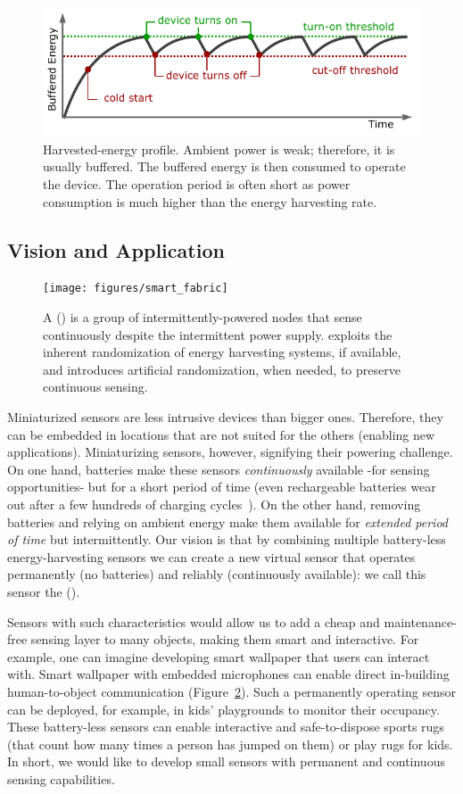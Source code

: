 \begin{figure}[b]
	\centering
		\includegraphics[width=\columnwidth]{figures/intermittent_operation}
		\caption{Harvested-energy profile. Ambient power is weak; therefore, it is usually buffered. The buffered energy is then consumed to operate the device. The operation period is often short as power consumption is much higher than the energy harvesting rate.}
		\label{fig:intermittent_opertaion}
\end{figure} 
%
\subsection{Vision and Application}
%
\begin{figure}[t]
	\centering
	\texttt{[image: figures/smart\_fabric]}
	\caption{A \fullcis (\cis) is a group of intermittently-powered nodes that sense continuously despite the intermittent power supply. \cis exploits the inherent randomization of energy harvesting systems, if available, and introduces artificial randomization, when needed, to preserve continuous sensing.}
	\label{fig:smart_fabric}
\end{figure}
%
Miniaturized sensors are less intrusive devices than bigger ones. Therefore, they can be embedded in locations that are not suited for the others (enabling new applications). Miniaturizing sensors, however, signifying their powering challenge.
On one hand, batteries make these sensors \emph{continuously} available -for sensing opportunities- but for a short period of time (even rechargeable batteries wear out after a few hundreds of charging cycles~\cite{aditya2008comparison}). 
On the other hand, removing batteries and relying on ambient energy make them available for \emph{extended period of time} but intermittently. Our vision is that by combining multiple battery-less energy-harvesting sensors we can create a new virtual sensor that operates permanently (no batteries) and reliably (continuously available): we call this sensor the \emph{\fullcis} (\cis).

Sensors with such characteristics would allow us to add a cheap and maintenance-free sensing layer to many objects, making them smart and interactive. For example, one can imagine developing smart wallpaper that users can interact with. 
Smart wallpaper with embedded microphones can enable direct in-building human-to-object communication (Figure~\ref{fig:smart_fabric}). Such a permanently operating sensor can be deployed, for example, in kids' playgrounds to monitor their occupancy. These battery-less sensors can enable
interactive and safe-to-dispose sports rugs (that count how many times a person has jumped on them) or play rugs for kids.
In short, we would like to develop small sensors with permanent and continuous sensing capabilities.  
%
